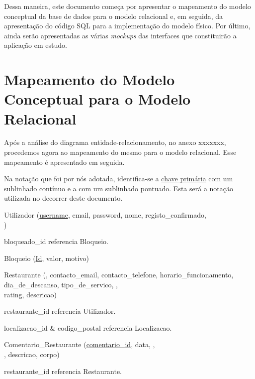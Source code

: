 \documentclass[a4paper,12pt]{report}
\begin{document}
	Dessa maneira, este documento começa por apresentar o mapeamento do modelo conceptual da base de dados para o modelo relacional e, em seguida, da apresentação do código SQL para a implementação do modelo físico. Por último, ainda serão apresentadas as várias \textit{mockups} das interfaces que constituirão a aplicação em estudo.   
	
	
\chapter{Mapeamento do Modelo Conceptual para o Modelo Relacional}

	Após a análise do diagrama entidade-relacionamento, no anexo xxxxxxx, procedemos agora ao mapeamento do mesmo para o modelo relacional. Esse mapeamento é apresentado em seguida.
	
	Na notação que foi por nós adotada, identifica-se a \underline{chave primária} com um sublinhado contínuo e a  com um sublinhado pontuado. Esta será a notação utilizada no decorrer deste documento.

\bigskip

Utilizador (\underline{username}, email, password, nome, registo\_confirmado, \\ )

\hspace*{1.5cm} bloqueado\_id referencia Bloqueio.

\medskip

Bloqueio (\underline{Id}, valor, motivo)

\medskip

Restaurante (\underline{}, contacto\_email, contacto\_telefone, horario\_funcionamento, dia\_de\_descanso, tipo\_de\_servico, ,\\ rating, descricao)

\hspace*{1.5cm} restaurante\_id referencia Utilizador.

\hspace*{1.5cm} localizacao\_id \& codigo\_postal referencia Localizacao.

\medskip

Comentario\_Restaurante (\underline{comentario\_id}, data, , \\ , descricao, corpo)

\hspace*{1.5cm} restaurante\_id referencia Restaurante.
\end{document}
